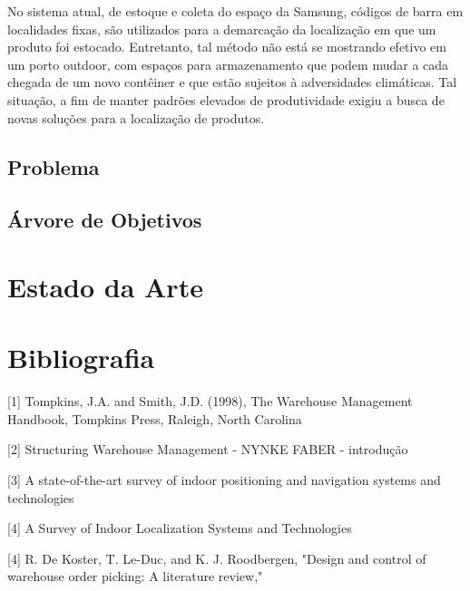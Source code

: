\documentclass[]{politex}
\begin{document}
No sistema atual, de estoque e coleta do espaço da Samsung, códigos de barra em localidades fixas, são utilizados para a demarcação da localização em que um produto foi estocado. Entretanto, tal método não está se mostrando efetivo em um porto outdoor, com espaços para armazenamento que podem mudar a cada chegada de um novo contêiner e que estão sujeitos à adversidades climáticas. Tal situação, a fim de manter padrões elevados de produtividade exigiu a busca de novas soluções para a localização de produtos.

\chapter{Problema}
\chapter{Árvore de Objetivos}

\part{Estado da Arte}

\part{Bibliografia}
[1] Tompkins, J.A. and Smith, J.D. (1998), The Warehouse Management Handbook,
Tompkins Press, Raleigh, North Carolina

[2] Structuring Warehouse
Management - NYNKE FABER - introdução

[3] A state-of-the-art survey of indoor
positioning and navigation systems and
technologies

[4] A Survey of Indoor Localization Systems and
Technologies

[4] R. De Koster, T. Le-Duc, and K. J. Roodbergen, "Design and control
of warehouse order picking: A literature review," 
\end{document}

